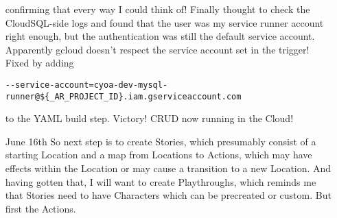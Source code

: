 \documentclass[12pt]{article}
\begin{document}
\begin{itemize}
  confirming that every way I could think of! Finally thought to check
  the CloudSQL-side logs and found that the user was my service runner
  account right enough, but the authentication was still the default
  service account. Apparently gcloud doesn't respect the service
  account set in the trigger! Fixed by adding
\begin{verbatim}
--service-account=cyoa-dev-mysql-runner@${_AR_PROJECT_ID}.iam.gserviceaccount.com
\end{verbatim}
  to the YAML build step. Victory! CRUD now running in the Cloud!
\item[June 16th] So next step is to create Stories, which presumably
  consist of a starting Location and a map from Locations to Actions,
  which may have effects within the Location or may cause a transition
  to a new Location. And having gotten that, I will want to create
  Playthroughs, which reminds me that Stories need to have Characters
  which can be precreated or custom. But first the Actions.
\end{itemize}
\end{document}
